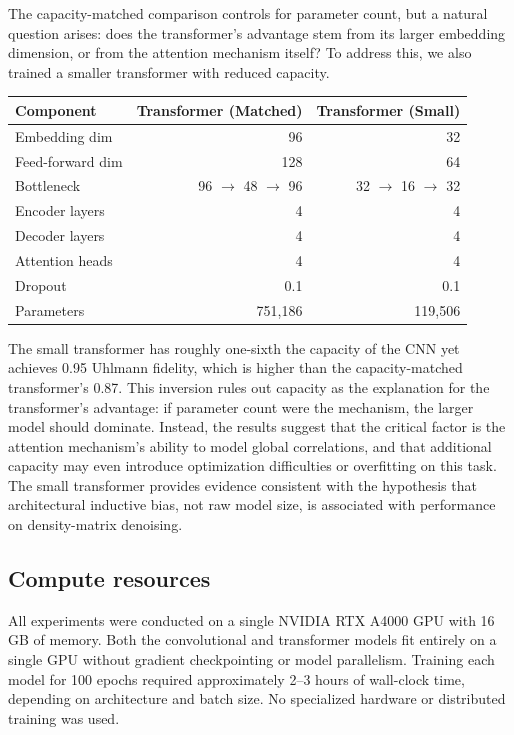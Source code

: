 \documentclass[a4paper, 11pt, colorlinks=true, citecolor=., linkcolor=black, urlcolor=black]{article}
\begin{document}
The capacity-matched comparison controls for parameter count, but a natural question arises: does the transformer's advantage stem from its larger embedding dimension, or from the attention mechanism itself? To address this, we also trained a smaller transformer with reduced capacity.

\begin{center}
\begin{tabular}{lrr}
Component & Transformer (Matched) & Transformer (Small)\\
\hline
Embedding dim & 96 & 32\\
Feed-forward dim & 128 & 64\\
Bottleneck & 96 \(\rightarrow\) 48 \(\rightarrow\) 96 & 32 \(\rightarrow\) 16 \(\rightarrow\) 32\\
Encoder layers & 4 & 4\\
Decoder layers & 4 & 4\\
Attention heads & 4 & 4\\
Dropout & 0.1 & 0.1\\
Parameters & 751,186 & 119,506\\
\end{tabular}
\end{center}

The small transformer has roughly one-sixth the capacity of the CNN yet achieves 0.95 Uhlmann fidelity, which is higher than the capacity-matched transformer's 0.87. This inversion rules out capacity as the explanation for the transformer's advantage: if parameter count were the mechanism, the larger model should dominate. Instead, the results suggest that the critical factor is the attention mechanism's ability to model global correlations, and that additional capacity may even introduce optimization difficulties or overfitting on this task. The small transformer provides evidence consistent with the hypothesis that architectural inductive bias, not raw model size, is associated with performance on density-matrix denoising.
\subsection{Compute resources}
\label{sec:orgb08d490}
All experiments were conducted on a single NVIDIA RTX A4000 GPU with 16 GB of memory. Both the convolutional and transformer models fit entirely on a single GPU without gradient checkpointing or model parallelism. Training each model for 100 epochs required approximately 2–3 hours of wall-clock time, depending on architecture and batch size. No specialized hardware or distributed training was used.
\newpage
\end{document}
